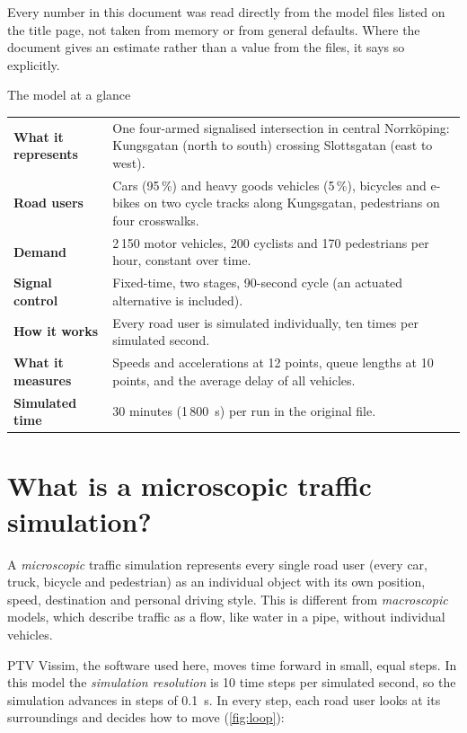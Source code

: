 \documentclass[11pt,a4paper]{article}
\begin{document}
Every number in this document was read directly from the model files listed on the title page,
not taken from memory or from general defaults. Where the document gives an estimate rather than a
value from the files, it says so explicitly.

\begin{keybox}{The model at a glance}
\begin{tabularx}{\linewidth}{@{}>{\bfseries}p{3.6cm}X@{}}
What it represents & One four-armed signalised intersection in central Norrk\"oping: Kungsgatan
(north to south) crossing Slottsgatan (east to west).\\
Road users & Cars (95\,\%) and heavy goods vehicles (5\,\%), bicycles and e-bikes on two cycle
tracks along Kungsgatan, pedestrians on four crosswalks.\\
Demand & 2\,150 motor vehicles, 200 cyclists and 170 pedestrians per hour, constant over time.\\
Signal control & Fixed-time, two stages, 90-second cycle (an actuated alternative is included).\\
How it works & Every road user is simulated individually, ten times per simulated second.\\
What it measures & Speeds and accelerations at 12 points, queue lengths at 10 points, and the
average delay of all vehicles.\\
Simulated time & 30 minutes (1\,800~s) per run in the original file.\\
\end{tabularx}
\end{keybox}

\tableofcontents
\newpage

\section{What is a microscopic traffic simulation?}
\label{sec:micro}

A \emph{microscopic} traffic simulation represents every single road user (every car, truck,
bicycle and pedestrian) as an individual object with its own position, speed, destination and
personal driving style. This is different from \emph{macroscopic} models, which describe traffic
as a flow, like water in a pipe, without individual vehicles.

PTV Vissim, the software used here, moves time forward in small, equal steps. In this model the
\emph{simulation resolution} is 10 time steps per simulated second, so the simulation advances in
steps of 0.1~s. In every step, each road user looks at its surroundings and decides how to move
(\cref{fig:loop}):
\end{document}
